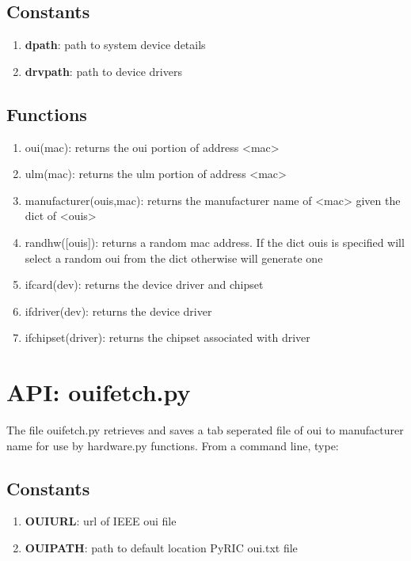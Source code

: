 \documentclass[11pt]{article}
\begin{document}
\begin{appendices}
\subsection{Constants}
\begin{enumerate}
\item \textbf{dpath}: path to system device details
\item \textbf{drvpath}: path to device drivers 
\end{enumerate}

\subsection{Functions}
\begin{enumerate}
\item oui(mac): returns the oui portion of address <mac>
\item ulm(mac): returns the ulm portion of address <mac>
\item manufacturer(ouis,mac): returns the manufacturer name of <mac> given the
dict of <ouis>
\item randhw([ouis]): returns a random mac address. If the dict ouis is specified 
will select a random oui from the dict otherwise will generate one
\item ifcard(dev): returns the device driver and chipset
\item ifdriver(dev): returns the device driver
\item ifchipset(driver): returns the chipset associated with driver
\end{enumerate}

\section{API: ouifetch.py}
The file ouifetch.py retrieves and saves a tab seperated file of oui to 
manufacturer name for use by hardware.py functions. From a command line, type: \\

\subsection{Constants}
\begin{enumerate}
\item \textbf{OUIURL}: url of IEEE oui file
\item \textbf{OUIPATH}: path to default location PyRIC oui.txt file
\end{enumerate}


\end{appendices}
\end{document}
